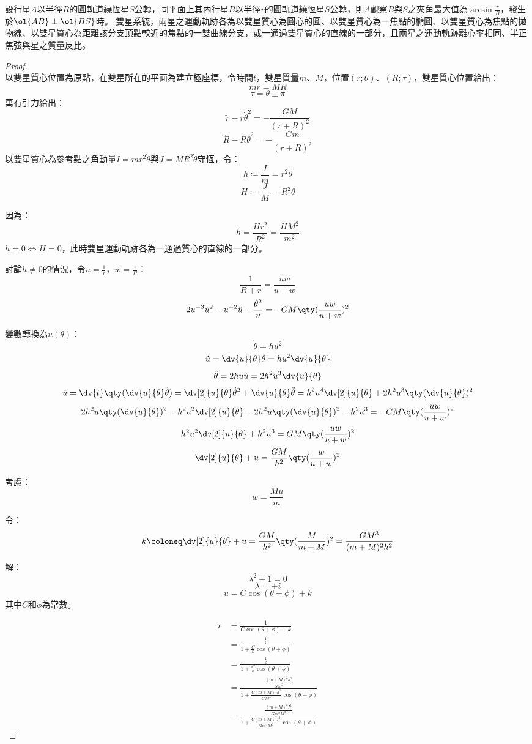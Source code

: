 \documentclass[a4paper,12pt]{article}
\begin{document}
設行星$A$以半徑$R$的圓軌道繞恆星$S$公轉，同平面上其內行星$B$以半徑$r$的圓軌道繞恆星$S$公轉，則$A$觀察$B$與$S$之夾角最大值為$\arcsin\frac{r}{R}$，發生於$\ol{AB}\perp\ol{BS}$時。
雙星系統，兩星之運動軌跡各為以雙星質心為圓心的圓、以雙星質心為一焦點的橢圓、以雙星質心為焦點的拋物線、以雙星質心為距離該分支頂點較近的焦點的一雙曲線分支，或一通過雙星質心的直線的一部分，且兩星之運動軌跡離心率相同、半正焦弦與星之質量反比。
\begin{proof}\mbox{}\\
以雙星質心位置為原點，在雙星所在的平面為建立極座標，令時間$t$，雙星質量$m$、$M$，位置$(r;\theta)$、$(R;\tau)$，雙星質心位置給出：
\[mr=MR\]
\[\tau=\theta\pm\pi\]
萬有引力給出：
\[\ddot{r}-r\dot{\theta}^2=-\frac{GM}{(r+R)^2}\]
\[\ddot{R}-R\dot{\theta}^2=-\frac{Gm}{(r+R)^2}\]
以雙星質心為參考點之角動量$I=mr^2\dot{\theta}$與$J=MR^2\dot{\theta}$守恆，令：
\[h\coloneq\frac{I}{m}=r^2\dot{\theta}\]
\[H\coloneq\frac{J}{M}=R^2\dot{\theta}\]

因為：
\[h=\frac{Hr^2}{R^2}=\frac{HM^2}{m^2}\]
$h=0\iff H=0$，此時雙星運動軌跡各為一通過質心的直線的一部分。

討論$h\neq0$的情況，令$u=\frac{1}{r}$，$w=\frac{1}{R}$：
\[\frac{1}{R+r}=\frac{uw}{u+w}\]
\[2u^{-3}\dot{u}^2-u^{-2}\ddot{u}-\frac{\dot{\theta}^2}{u}=-GM\qty(\frac{uw}{u+w})^2\]

變數轉換為$u(\theta)$：
\[\dot{\theta}=h u^2\]
\[\dot{u}=\dv{u}{\theta}\dot{\theta}=h u^2\dv{u}{\theta}\]
\[\ddot{\theta}=2h u\dot{u}=2h^2u^3\dv{u}{\theta}\]
\[\ddot{u}=\dv{t}\qty(\dv{u}{\theta}\dot{\theta})=\dv[2]{u}{\theta}\dot{\theta}^2+\dv{u}{\theta}\ddot{\theta}=h^2u^4\dv[2]{u}{\theta}+2h^2u^3\qty(\dv{u}{\theta})^2\]
\[2h^2u\qty(\dv{u}{\theta})^2-h^2u^2\dv[2]{u}{\theta}-2h^2u\qty(\dv{u}{\theta})^2-h^2u^3=-GM\qty(\frac{uw}{u+w})^2\]
\[h^2u^2\dv[2]{u}{\theta}+h^2u^3=GM\qty(\frac{uw}{u+w})^2\]
\[\dv[2]{u}{\theta}+u=\frac{GM}{h^2}\qty(\frac{w}{u+w})^2\]

考慮：
\[w=\frac{Mu}{m}\]

令：
\[k\coloneq\dv[2]{u}{\theta}+u=\frac{GM}{h^2}\qty(\frac{M}{m+M})^2=\frac{GM^3}{(m+M)^2h^2}\]

解：
\[\lambda^2+1=0\]
\[\lambda=\pm i\]
\[u=C\cos(\theta+\phi)+k\]
其中$C$和$\phi$為常數。

\[\begin{aligned}
r&=\frac{1}{C\cos(\theta+\phi)+k}\\
&=\frac{\frac{1}{k}}{1+\frac{C}{k}\cos(\theta+\phi)}\\
&=\frac{\frac{1}{k}}{1+\frac{C}{k}\cos(\theta+\phi)}\\
&=\frac{\frac{(m+M)^2h^2}{GM^3}}{1+\frac{C(m+M)^2h^2}{GM^3}\cos(\theta+\phi)}\\
&=\frac{\frac{(m+M)^2I^2}{Gm^2M^3}}{1+\frac{C(m+M)^2I^2}{Gm^2M^3}\cos(\theta+\phi)}
\end{aligned}\]


\end{proof}
\end{document}
